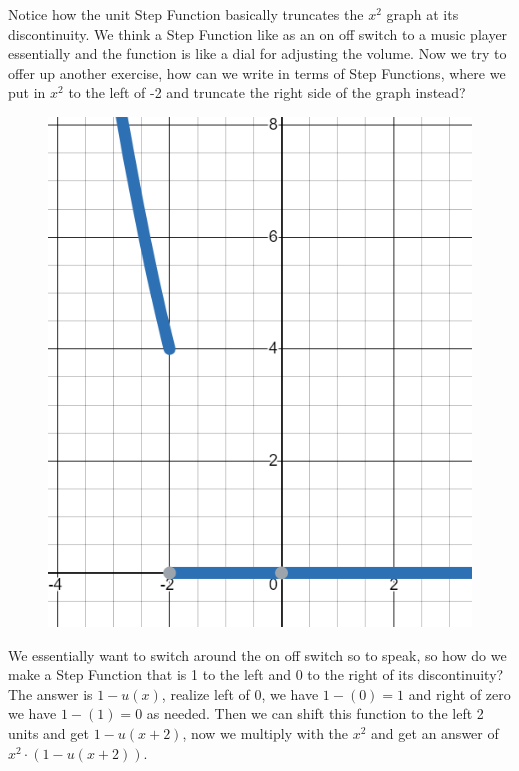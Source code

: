 \documentclass[12pt]{article}
\begin{document}
Notice how the unit Step Function basically truncates the $x^2$ graph at its discontinuity. We think a Step Function like as an on off switch to a music player essentially and the function is like a dial for adjusting the volume. Now we try to offer up another exercise, how can we write in terms of Step Functions, where we put in $x^2$ to the left of -2 and truncate the right side of the graph instead? 

\begin{figure}[!htbp]
\centering
\includegraphics[scale=.5]{step5.PNG}
\label{fig:hsf5}
\end{figure}

We essentially want to switch around the on off switch so to speak, so how do we make a Step Function that is 1 to the left and 0 to the right of its discontinuity? The answer is $1-u(x)$, realize left of 0, we have $1-(0)=1$ and right of zero we have $1-(1)=0$ as needed. Then we can shift this function to the left 2 units and get $1-u(x+2)$, now we multiply with the $x^2$ and get an answer of $x^2\cdot(1-u(x+2))$. \\
\end{document}
